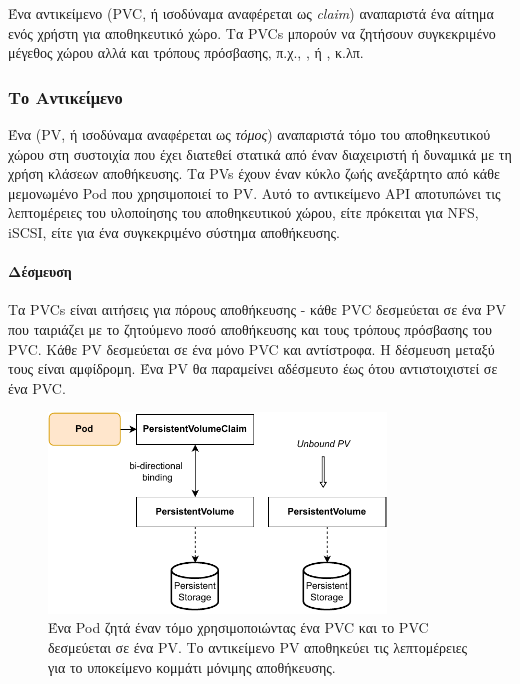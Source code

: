 Ένα αντικείμενο  (PVC, ή ισοδύναμα αναφέρεται ως
\textit{claim}) αναπαριστά ένα αίτημα ενός χρήστη για αποθηκευτικό χώρο.  Τα
PVCs μπορούν να ζητήσουν συγκεκριμένο μέγεθος χώρου αλλά και τρόπους πρόσβασης,
π.χ., ,  ή , κ.λπ.

\subsubsection{Το Αντικείμενο }

Ένα  (PV, ή ισοδύναμα αναφέρεται ως \textit{τόμος})
αναπαριστά τόμο του αποθηκευτικού χώρου στη συστοιχία που έχει διατεθεί στατικά
από έναν διαχειριστή ή δυναμικά με τη χρήση κλάσεων αποθήκευσης. Τα PVs έχουν
έναν κύκλο ζωής ανεξάρτητο από κάθε μεμονωμένο Pod που χρησιμοποιεί το PV. Αυτό
το αντικείμενο API αποτυπώνει τις λεπτομέρειες του υλοποίησης του αποθηκευτικού
χώρου, είτε πρόκειται για NFS, iSCSI, είτε για ένα συγκεκριμένο σύστημα
αποθήκευσης.

\paragraph*{Δέσμευση}

Τα PVCs είναι αιτήσεις για πόρους αποθήκευσης - κάθε PVC δεσμεύεται σε ένα PV που
ταιριάζει με το ζητούμενο ποσό αποθήκευσης και τους τρόπους πρόσβασης του PVC.
Κάθε PV δεσμεύεται σε ένα μόνο PVC και αντίστροφα. Η δέσμευση μεταξύ τους είναι
αμφίδρομη.  Ένα PV θα παραμείνει αδέσμευτο έως ότου αντιστοιχιστεί σε ένα PVC.

\begin{figure}[ht]
      \centering
      \includegraphics[width=0.8\textwidth]{resources/pvc-pv-binding.pdf}
      \caption{Ένα Pod ζητά έναν τόμο χρησιμοποιώντας ένα PVC και το PVC δεσμεύεται σε ένα PV. Το αντικείμενο PV αποθηκεύει τις λεπτομέρειες για το υποκείμενο κομμάτι μόνιμης αποθήκευσης.}
      \label{figure:gr-pvc-pv}
\end{figure}

